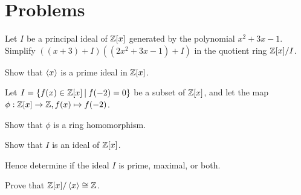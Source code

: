 \newpage

\section{Problems}
\begin{problem}
    Let $I$ be a principal ideal of $\mathbb{Z}[x]$ generated by the polynomial $x^2 + 3x - 1$. Simplify $\left((x + 3) + I\right)\left((2x^2 + 3x - 1) + I\right)$ in the quotient ring $\mathbb{Z}[x]/I$.
\end{problem}

\begin{problem}
    Show that $\left\langle x\right\rangle$ is a prime ideal in $\mathbb{Z}[x]$.
\end{problem}

\begin{problem}
    Let $I = \{f(x) \in \Z[x] \vert f(-2) = 0\}$ be a subset of $\mathbb{Z}[x]$, and let the map $\phi:\mathbb{Z}[x]\to\mathbb{Z}, f(x) \mapsto f(-2)$.
    \begin{partquestions}{\roman*}
        \item Show that $\phi$ is a ring homomorphism.
        \item Show that $I$ is an ideal of $\mathbb{Z}[x]$.
        \item Hence determine if the ideal $I$ is prime, maximal, or both.
    \end{partquestions}
\end{problem}

\begin{problem}
    Prove that $\mathbb{Z}[x] / \left\langle x\right\rangle \cong \mathbb{Z}$.
\end{problem}
